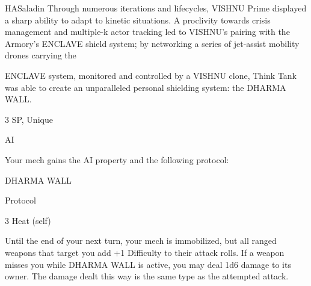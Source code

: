 \begin{mech}{HA}{Saladin}
Through numerous iterations and lifecycles, VISHNU Prime displayed a sharp ability to adapt to kinetic situations. A proclivity towards crisis management and multiple-k actor tracking led to VISHNU’s pairing with the Armory’s ENCLAVE shield system; by networking a series of jet-assist mobility drones carrying the

ENCLAVE system, monitored and controlled by a VISHNU clone, Think Tank was able to create an unparalleled personal shielding system: the DHARMA WALL.

3 SP, Unique

AI

Your mech gains the AI property and the following protocol:


DHARMA WALL

Protocol

3 Heat (self)

Until the end of your next turn, your mech is immobilized, but all ranged weapons that target you add +1 Difficulty to their attack rolls. If a weapon misses you while DHARMA WALL is active, you may deal 1d6 damage to its owner. The damage dealt this way is the same type as the attempted attack.



\end{mech}